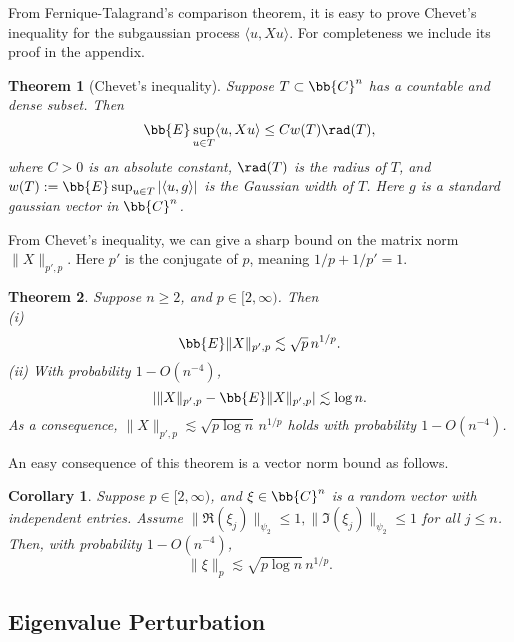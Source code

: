 \documentclass[12pt]{article}%
\theoremstyle{plain}%
\newtheorem{thm}{Theorem}[section]
\newtheorem{cor}{Corollary}[section]
\theoremstyle{remark}
\begin{document}
From Fernique-Talagrand's comparison theorem, it is easy to prove Chevet's inequality \citep{Che78} for the subgaussian process $\langle u, Xu \rangle$. For completeness we include its proof in the appendix.

\begin{thm}[Chevet's inequality]\label{thm::Chevet}
Suppose $T \subset \bb{C}^{n}$ has a countable and dense subset. Then
\begin{equation*}
\bb{E} \sup_{u \in T} \langle u, Xu \rangle \le C w(T) \rad(T),
\end{equation*}
where $C>0$ is an absolute constant, $\rad(T)$ is the radius of $T$, and $w(T) := \bb{E} \sup_{u \in T} | \langle u, g \rangle |$ is the Gaussian width of $T$. Here $g$ is a standard gaussian vector in $\bb{C}^n$.
\end{thm}

From Chevet's inequality, we can give a sharp bound on the matrix norm $\| X \|_{p',p}$. Here $p'$ is the conjugate of $p$, meaning $1/p + 1/p' = 1$. 

\begin{thm}\label{thm::opNorm}
Suppose $n \ge 2$, and $p \in [2,\infty)$. Then\\
(i) %
\begin{equation*}
\bb{E} \| X \|_{p',p} \lesssim \sqrt{p}\, n^{1/p}.
\end{equation*}
(ii) With probability $1 - O(n^{-4})$,
\begin{equation*}
| \| X \|_{p',p} - \bb{E} \| X \|_{p',p}  | \lesssim \log n.
\end{equation*}
As a consequence, $\| X \|_{p',p} \lesssim \sqrt{p \log n}\, n^{1/p}$ holds with probability $1 - O(n^{-4})$.
\end{thm}

An easy consequence of this theorem is a vector norm bound as follows.

\begin{cor}\label{cor::conctrNorm}
Suppose $p \in [2, \infty)$, and $\xi \in \bb{C}^n$ is a random vector with independent entries. Assume $\| \Re(\xi_j) \|_{\psi_2} \le 1,  \| \Im(\xi_j) \|_{\psi_2} \le 1$ for all $j \le n$. Then, with probability $1 - O(n^{-4})$, 
\begin{equation*}
\| \xi \|_p \lesssim \sqrt{p \log n}\, n^{1/p}.
\end{equation*}
\end{cor}

\subsection{Eigenvalue Perturbation}\label{sec::eigvalPtb}
\end{document}
